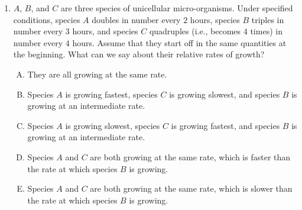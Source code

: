 \documentclass[10pt]{amsart}
\begin{document}
\begin{enumerate}
  {\em Explanation}: Since $90\%$ of the radioactive substance decays,
  the fraction left is $0.1$. Let $x$ be the time taken for this to
  happen. Then:

  $$\frac{\ln 0.5}{3} = \frac{\ln 0.1}{x}$$

  Simplifying, we obtain that:

  $$x = \frac{3 \ln 10}{\ln 2}$$

  Since $\ln 10 \approx 2.3$ and $\ln 2 \approx 0.69$, we see that $x
  \approx 10$. Thus, the closest integer to $x$ is $n = 10$.

  We can work this out even if we do not remember $\ln 10$ and $\ln
  2$. In order to do this, we need to recognize that:

  $$x = 3 \log_2(10)$$

  Now, $\log_2(10) > 3$ since $2^3 = 8 < 10$, so $3 \log_2(10) >
  9$. Also, $\log_2(10) < 4$ since $2^4 = 16 > 10$, so $3 \log_2(10) <
  12$. Thus, the closest integer should be somewhere betwee $9$ and
  $12$. For further estimation, we verify that $2^{1/3} \approx 1.26$,
  so $2^{10/3} \approx 8 (1.26)$ which is slightly greater than
  $10$. Thus, $\log_2(10)$ is just slightly less than $10/3$, so $3
  \log_2(10)$ is just slightly less than $10$, so $n = 10$ works.

  Another way of seeing this is that $2^{10} = 1024$ (a standard fact
  in computer storage measurements) which is close to $10^3$ (in fact,
  $1KB$ actually means $1024$ bytes, not $1000$ bytes). Thus,
  $2^{10/3} \approx 10$, which is what we need.

  {\em Performance review}: $10$ out of $12$ got this correct. $1$
  chose (A), $1$ chose (C).

  {\em Historical note (last year)}: $23$ out of $29$ people got this
  correct. $4$ people chose (C), $1$ person chose (A), and $1$ person
  left the question blank.
\item $A$, $B$, and $C$ are three species of unicellular
  micro-organisms. Under specified conditions, species $A$ doubles in
  number every $2$ hours, species $B$ triples in number every $3$
  hours, and species $C$ quadruples (i.e., becomes $4$ times) in
  number every $4$ hours. Assume that they start off in the same
  quantities at the beginning. What can we say about their relative
  rates of growth?
  \begin{enumerate}[(A)]
  \item They are all growing at the same rate.
  \item Species $A$ is growing fastest, species $C$ is growing
    slowest, and species $B$ is growing at an intermediate rate.
  \item Species $A$ is growing slowest, species $C$ is growing
    fastest, and species $B$ is growing at an intermediate rate.
  \item Species $A$ and $C$ are both growing at the same rate, which
    is faster than the rate at which species $B$ is growing.
  \item Species $A$ and $C$ are both growing at the same rate, which
    is slower than the rate at which species $B$ is growing.
  \end{enumerate}


\end{enumerate}
\end{document}
